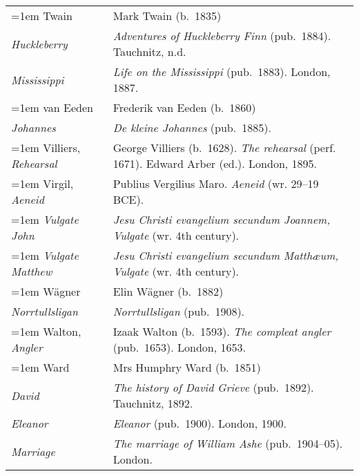 \begin{xltabular}{\textwidth}{ lQ }
\hangindent=1em  Twain & Mark Twain (b.~1835) \\
\hspace{1em}\textit{Huckleberry} & \textit{Adventures of Huckleberry Finn} (pub.~1884). Tauchnitz, n.d. \\
\hspace{1em}\textit{Mississippi} & \textit{Life on the Mississippi} (pub.~1883). London, 1887. \\

\pagebreak
\hangindent=1em  van Eeden & Frederik van Eeden (b.~1860) \\
\hspace{1em}\textit{Johannes} & \textit{De kleine Johannes} (pub.~1885).\\

\hangindent=1em  Villiers, \textit{Rehearsal} & George Villiers (b.~1628). \textit{The rehearsal} (perf. 1671). Edward Arber (ed.). London, 1895. \\

\hangindent=1em  Virgil, \textit{Aeneid} & Publius Vergilius Maro. \textit{Aeneid} (wr. 29--19 BCE). \\

\hangindent=1em  \textit{Vulgate John} & \textit{Jesu Christi evangelium secundum Joannem, Vulgate} (wr. 4th century). \\
\hangindent=1em  \textit{Vulgate Matthew} & \textit{Jesu Christi evangelium secundum Matthæum, Vulgate} (wr. 4th century). \\

\hangindent=1em  Wägner  & Elin Wägner (b.~1882) \\
\hspace{1em}\textit{Norrtullsligan} & \textit{Norrtullsligan} (pub.~1908).\\

\hangindent=1em  Walton, \textit{Angler} & Izaak Walton (b.~1593). \textit{The compleat angler} (pub.~1653). London, 1653. \\

\hangindent=1em  Ward & Mrs Humphry Ward (b.~1851) \\
\hspace{1em}\textit{David} & \textit{The history of David Grieve} (pub.~1892). Tauchnitz, 1892. \\
\hspace{1em}\textit{Eleanor} & \textit{Eleanor} (pub.~1900). London, 1900. \\
\hspace{1em}\textit{Marriage} & \textit{The marriage of William Ashe} (pub.~1904--05). London. \\


\end{xltabular}
